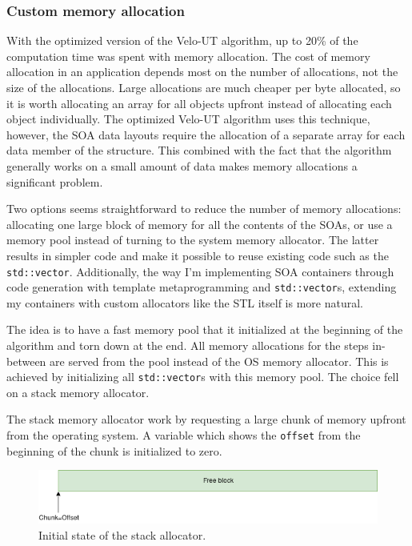 \documentclass[12pt]{article}
\newcommand{\code}[1]{\texttt{#1}}
\begin{document}
\subsubsection{Custom memory allocation} \label{sec_velout_stack_alloc}

With the optimized version of the Velo-UT algorithm, up to 20\% of the computation time was spent with memory allocation. The cost of memory allocation in an application depends most on the number of allocations, not the size of the allocations. Large allocations are much cheaper per byte allocated, so it is worth allocating an array for all objects upfront instead of allocating each object individually. The optimized Velo-UT algorithm uses this technique, however, the SOA data layouts require the allocation of a separate array for each data member of the structure. This combined with the fact that the algorithm generally works on a small amount of data makes memory allocations a significant problem.

\vspace{1pc}

Two options seems straightforward to reduce the number of memory allocations: allocating one large block of memory for all the contents of the SOAs, or use a memory pool instead of turning to the system memory allocator. The latter results in simpler code and make it possible to reuse existing code such as the \code{std::vector}. Additionally, the way I'm implementing SOA containers through code generation with template metaprogramming and \code{std::vector}s, extending my containers with custom allocators like the STL itself is more natural.

\vspace{1pc}

The idea is to have a fast memory pool that it initialized at the beginning of the algorithm and torn down at the end. All memory allocations for the steps in-between are served from the pool instead of the OS memory allocator. This is achieved by initializing all \code{std::vector}s with this memory pool.
The choice fell on a stack memory allocator.

\vspace{1pc}

The stack memory allocator work by requesting a large chunk of memory upfront from the operating system. A variable which shows the \code{offset} from the beginning of the chunk is initialized to zero.

\begin{figure}[H]
	\begin{center}
		\includegraphics[width=\textwidth]{velout_stack_allocator_initial}
	\end{center}
	\caption{Initial state of the stack allocator.}
	\label{fig_velout_stack_allocator_initial}
\end{figure}
\end{document}
